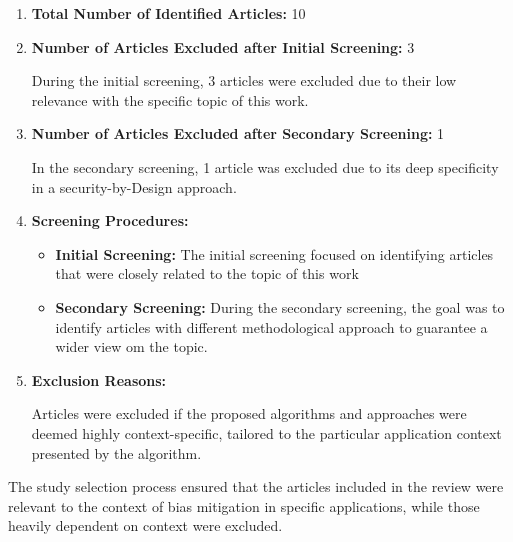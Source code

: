 \documentclass{article}
\begin{document}
    \begin{enumerate}
        \item \textbf{Total Number of Identified Articles:} 10
        \item \textbf{Number of Articles Excluded after Initial Screening:} 3
        
        During the initial screening, 3 articles were excluded due to their low relevance with the specific topic of this work.
        
        \item \textbf{Number of Articles Excluded after Secondary Screening:} 1
        
        In the secondary screening, 1 article was excluded due to its deep specificity in a security-by-Design approach.
        
        \item \textbf{Screening Procedures:}
        
        \begin{itemize}
            \item \textbf{Initial Screening:} The initial screening focused on identifying articles that were closely related to the topic of this work
            
            \item \textbf{Secondary Screening:} During the secondary screening, the goal was to identify articles with different methodological approach to guarantee a wider view om the topic.
        \end{itemize}
        
        \item \textbf{Exclusion Reasons:}
        
        Articles were excluded if the proposed algorithms and approaches were deemed highly context-specific, tailored to the particular application context presented by the algorithm.
    
    \end{enumerate}
    
    The study selection process ensured that the articles included in the review were relevant to the context of bias mitigation in specific applications, while those heavily dependent on context were excluded.
\end{document}

